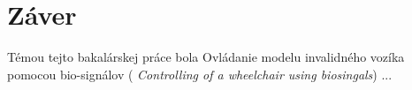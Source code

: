 \chapter*{Záver}  %





\tab[5 mm] Témou tejto bakalárskej práce bola Ovládanie modelu invalidného vozíka pomocou bio-signálov (
\textit{Controlling of a wheelchair using biosingals}) ...


